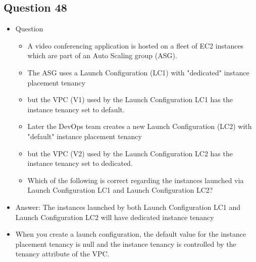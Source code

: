 \documentclass[]{scrartcl}
\begin{document}
\subsection{Question 48}
\begin{itemize}
	\item Question
	\begin{itemize}
		\item A video conferencing application is hosted on a fleet of EC2 instances which are part of an Auto Scaling group (ASG). 
		\item The ASG uses a Launch Configuration (LC1) with "dedicated" instance placement tenancy 
		\item but the VPC (V1) used by the Launch Configuration LC1 has the instance tenancy set to default. \item Later the DevOps team creates a new Launch Configuration (LC2) with "default" instance placement tenancy 
		\item but the VPC (V2) used by the Launch Configuration LC2 has the instance tenancy set to dedicated.
		\item Which of the following is correct regarding the instances launched via Launch Configuration LC1 and Launch Configuration LC2?
	\end{itemize}
	\item Answer: The instances launched by both Launch Configuration LC1 and Launch Configuration LC2 will have dedicated instance tenancy
	\item When you create a launch configuration, the default value for the instance placement tenancy is null and the instance tenancy is controlled by the tenancy attribute of the VPC. 
\end{itemize}
\end{document}
